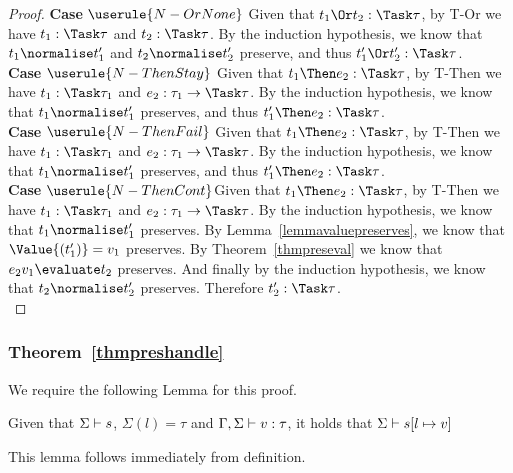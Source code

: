\begin{proof}
  \noindent\textbf{Case} $\userule{N-OrNone}$ Given that $t_1\Or t_2:\Task\tau$,
  by T-Or we have $t_1:\Task\tau$ and $t_2:\Task\tau$. By the induction hypothesis,
  we know that $t_1\normalise t_1'$ and $t_2\normalise t_2'$ preserve, and thus
  $t_1'\Or t_2':\Task\tau$.\\

  \noindent\textbf{Case} $\userule{N-ThenStay}$ Given that $t_1\Then e_2:\Task\tau$,
  by T-Then we have $t_1:\Task\tau_1$ and $e_2:\tau_1\to\Task\tau$. By the induction
  hypothesis, we know that $t_1\normalise t_1'$ preserves, and thus $t_1'\Then e_2:\Task\tau$.\\

  \noindent\textbf{Case} $\userule{N-ThenFail}$ Given that $t_1\Then e_2:\Task\tau$,
  by T-Then we have $t_1:\Task\tau_1$ and $e_2:\tau_1\to\Task\tau$. By the induction
  hypothesis, we know that $t_1\normalise t_1'$ preserves, and thus $t_1'\Then e_2:\Task\tau$.\\

  \noindent\textbf{Case} $\userule{N-ThenCont}$Given that $t_1\Then e_2:\Task\tau$,
  by T-Then we have $t_1:\Task\tau_1$ and $e_2:\tau_1\to\Task\tau$. By the induction
  hypothesis, we know that $t_1\normalise t_1'$ preserves. By
  Lemma~\ref{lemmavaluepreserves}, we know that $\Value{(t_1')}=v_1$ preserves.
  By Theorem~\ref{thmpreseval} we know that $e_2 v_1\evaluate t_2$ preserves. And
  finally by the induction hypothesis, we know that $t_2\normalise t_2'$ preserves.
  Therefore $t_2':\Task\tau$.\\

\end{proof}


\subsubsection{Theorem~\ref{thmpreshandle}}

We require the following Lemma for this proof.

\begin{lemma}
  Given that $\Sigma\vdash s$, $\Sigma(l)=\tau$ and $\Gamma,\Sigma\vdash v:\tau$, it holds that $\Sigma\vdash s[l\mapsto v]$
  \label{lemmasigmaconsistent}
\end{lemma}
This lemma follows immediately from definition.

